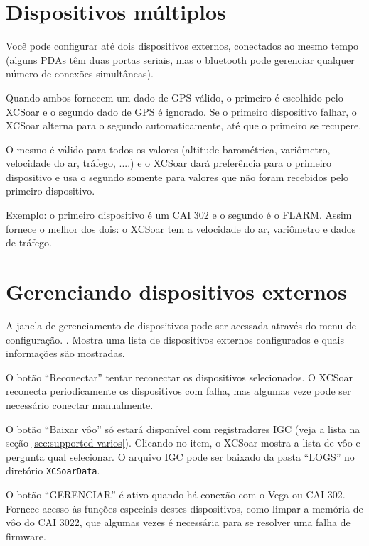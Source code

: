 \section{Dispositivos múltiplos }

Você pode configurar até dois dispositivos externos, conectados ao mesmo tempo (alguns PDAs têm duas portas seriais, mas o bluetooth pode gerenciar qualquer número de conexões simultâneas).

Quando ambos fornecem um dado de GPS válido, o primeiro é escolhido pelo XCSoar e o segundo dado de GPS é ignorado.  Se o primeiro dispositivo falhar, o XCSoar alterna para o segundo automaticamente, até que o primeiro se recupere.

O mesmo é válido para todos os valores (altitude barométrica, variômetro, velocidade do ar, tráfego, ....) e o XCSoar dará preferência para o primeiro dispositivo e usa o segundo somente para valores que não foram recebidos pelo primeiro dispositivo.

Exemplo: o primeiro dispositivo é um CAI 302 e o segundo é o FLARM.  Assim fornece o melhor dos dois: o XCSoar tem a velocidade do ar, variômetro e dados de tráfego.  



\section{Gerenciando dispositivos externos}

A janela de gerenciamento de dispositivos pode ser acessada através do menu de configuração.
. Mostra uma lista de dispositivos externos configurados e quais informações são mostradas.

O botão “Reconectar” tentar reconectar os dispositivos selecionados.  O XCSoar reconecta periodicamente os dispositivos com falha, mas algumas veze pode ser necessário conectar manualmente.

O botão “Baixar vôo” só estará disponível com registradores IGC (veja a lista na seção \ref{sec:supported-varios}).  Clicando no item, o XCSoar mostra a lista de vôo e pergunta qual selecionar.  O arquivo IGC pode ser baixado da pasta “LOGS” no diretório \texttt{XCSoarData}.

O botão “GERENCIAR” é ativo quando há conexão com o Vega ou CAI 302.  Fornece acesso às funções especiais destes dispositivos, como limpar a memória de vôo do CAI 3022, que algumas vezes é necessária para se resolver uma falha de firmware.  
